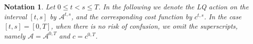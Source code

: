 \documentclass[reqno]{amsart}
\theoremstyle{plain}
\newtheorem{notation}[thm]{Notation}
\theoremstyle{definition}
\theoremstyle{remark}
\newtheorem{rem}[thm]{Remark}
\begin{document}
        \begin{notation}\label{LQ_intermediate_action_and_cost} Let $0\leq t < s \leq T$. In the following we denote the LQ action on the interval $[t,s]$ by $\mathcal{A}^{t,s}$, and the corresponding cost function by $c^{t,s}$. In the case $[t,s]=[0,T]$, when there is no risk of confusion, we omit the superscripts, namely $\mathcal{A}=\mathcal{A}^{0,T}$ and $c=c^{0,T}$.
        \end{notation}

    

    
\end{document}
